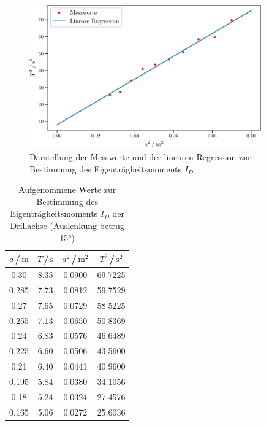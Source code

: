 \begin{figure}
    \centering
    \includegraphics[width=10cm]{build/plot.pdf}
    \caption{Darstellung der Messwerte und der linearen Regression zur Bestimmung des Eigenträgheitsmoments $I_D$}
\end{figure}




\begin{table}[H]
\normalsize

\centering
{}
\begin{tabular}{c c c c}
\toprule
    $a$\,/\,$\si{\meter}$ &  $T$\,/\,$\si{\second}$ & $a^2$\,/\,$\si{\meter}^2$ &  $T^2$\,/\,$\si{\second}^2$ \\
    \midrule

0.30  &   8.35 &  0.0900      & 69.7225\\
0.285 &   7.73 &  0.0812  & 59.7529\\
0.27  &   7.65 &  0.0729    & 58.5225\\
0.255 &   7.13 &  0.0650  & 50.8369\\
0.24  &   6.83 &  0.0576    & 46.6489\\
0.225 &   6.60 &  0.0506  & 43.5600\\
0.21  &   6.40 &  0.0441    & 40.9600\\
0.195 &   5.84 &  0.0380  & 34.1056\\
0.18  &   5.24 &  0.0324    & 27.4576\\
0.165 &   5.06 &  0.0272  & 25.6036\\ 

    \bottomrule
\end{tabular}
\caption{Aufgenommene Werte zur Bestimmung des Eigenträgheitsmoments $I_{D}$ der Drillachse (Auslenkung betrug 15°)}
\label{tab:a2}
\end{table}





